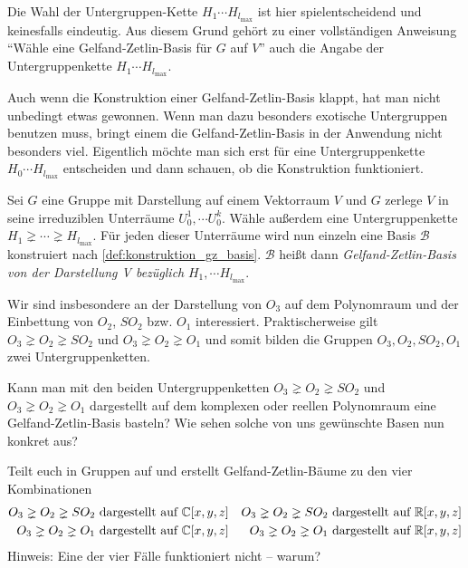 \begin{remark}
		Die Wahl der Untergruppen-Kette $H_1\cdots H_{l_{\text{max}}}$ ist hier spielentscheidend und keinesfalls eindeutig. Aus diesem Grund gehört zu einer vollständigen Anweisung \enquote{Wähle eine Gelfand-Zetlin-Basis für $G$ auf $V$} auch die Angabe der Untergruppenkette $H_1\cdots H_{l_{\text{max}}}$.
\end{remark}
\begin{remark}
	Auch wenn die Konstruktion einer Gelfand-Zetlin-Basis klappt, hat man nicht unbedingt etwas gewonnen. Wenn man dazu besonders exotische Untergruppen benutzen muss, bringt einem die Gelfand-Zetlin-Basis in der Anwendung nicht besonders viel. Eigentlich möchte man sich erst für eine Untergruppenkette $H_0\cdots H_{l_{\text{max}}}$ entscheiden und dann schauen, ob die Konstruktion funktioniert.
\end{remark}
\begin{definition}[$\Gae\jae\el\soft\fae\aaa\en\dae$-$\Zae\jae\tae\el\iii\en$-$\Bae\aaa\sae\aaa$]
	\label{def:gz_basis}
	Sei $G$ eine Gruppe mit Darstellung auf einem Vektorraum $V$ und $G$ zerlege $V$ in seine irreduziblen Unterräume $U^1_0,\cdots U^k_0$. Wähle außerdem eine Untergruppenkette $H_1 \gneq\cdots\gneq H_{l_{\text{max}}}$. Für jeden dieser Unterräume wird nun einzeln eine Basis $\mathcal{B}$ konstruiert nach \ref{def:konstruktion_gz_basis}. $\mathcal{B}$ heißt dann \emph{Gelfand-Zetlin-Basis von der Darstellung V bezüglich} $H_1,\cdots H_{l_{\text{max}}}$. 
\end{definition}

\begin{remark}
	Wir sind insbesondere an der Darstellung von $O_3$ auf dem Polynomraum und der Einbettung von $O_2$, $SO_2$ bzw. $O_1$ interessiert. Praktischerweise gilt $O_3\gneq O_2\gneq SO_2$ und  $O_3\gneq O_2\gneq O_1$ und somit bilden die Gruppen $O_3, O_2, SO_2, O_1$ zwei Untergruppenketten.
\end{remark}

\begin{centralquestion}[Fortsetzung]\label{cq:fortsetzung}
	Kann man mit den beiden Untergruppenketten $O_3\gneq O_2\gneq SO_2$ und  $O_3\gneq O_2\gneq O_1$ dargestellt auf dem komplexen oder reellen Polynomraum eine Gelfand-Zetlin-Basis basteln? Wie sehen solche von uns gewünschte Basen nun konkret aus?

	Teilt euch in Gruppen auf und erstellt Gelfand-Zetlin-Bäume zu den vier Kombinationen
	\begin{align*}
		O_3\gneq O_2\gneq SO_2 \text{ dargestellt auf }& \mathbb{C}[x,y,z] & O_3\gneq O_2\gneq SO_2 \text{ dargestellt auf }& \mathbb{R}[x,y,z] \\
		O_3\gneq O_2\gneq O_1 \text{ dargestellt auf }& \mathbb{C}[x,y,z] & O_3\gneq O_2\gneq O_1 \text{ dargestellt auf }& \mathbb{R}[x,y,z]
	\end{align*}
	Hinweis: Eine der vier Fälle funktioniert nicht -- warum?
\end{centralquestion}

